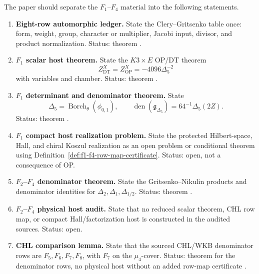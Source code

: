 \begin{proposition}
\label{prop:f1-f4-structure-recommendation}
The paper should separate the \(F_1\)--\(F_4\) material into the
following statements.
\begin{enumerate}
\item \textbf{Eight-row automorphic ledger.}  State the
Clery--Gritsenko table once: form, weight, group, character or
multiplier, Jacobi input, divisor, and product normalization.  Status:
theorem \cite{GC}.
\item \textbf{\(F_1\) scalar host theorem.}  State the
\(K3\times E\) OP/DT theorem
\[
Z^X_{\mathrm{DT}}=Z^X_{\mathrm{OP}}=-4096\Delta_5^{-2}
\]
with variables and chamber.  Status: theorem
\cite{OB,OPand,OberdieckReducedPT}.
\item \textbf{\(F_1\) determinant and denominator theorem.}  State
\[
\Delta_5=\operatorname{Borch}_{\theta}(\phi_{0,1}),\qquad
\operatorname{den}(\mathfrak g_{\Delta_5})=64^{-1}\Delta_5(2Z).
\]
Status: theorem \cite{GN}.
\item \textbf{\(F_1\) compact host realization problem.}  State the
protected Hilbert-space, Hall, and chiral Koszul realization as an open
problem or conditional theorem using
Definition~\ref{def:f1-f4-row-map-certificate}.  Status: open, not a
consequence of OP.
\item \textbf{\(F_2\)--\(F_4\) denominator theorem.}  State the
Gritsenko--Nikulin products and denominator identities for
\(\Delta_2,\Delta_1,\Delta_{1/2}\).  Status: theorem \cite{GNII}.
\item \textbf{\(F_2\)--\(F_4\) physical host audit.}  State that no
reduced scalar theorem, CHL row map, or compact Hall/factorization host
is constructed in the audited sources.  Status: open.
\item \textbf{CHL comparison lemma.}  State that the sourced CHL/WKB
denominator rows are \(F_5,F_6,F_7,F_8\), with \(F_7\) on the
\(\mu_4\)-cover.  Status: theorem for the denominator rows, no physical
host without an added row-map certificate
\cite{CD09BKM,GK09CHL,GK10Composite,Gov11BKM}.
\end{enumerate}
\end{proposition}


